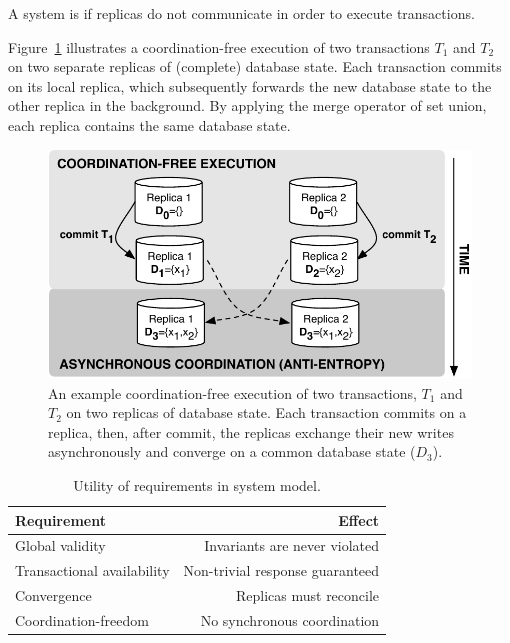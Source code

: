 \begin{definition}
A system is \textit{\cfree} if replicas do not communicate in order to
execute transactions.
\end{definition}

Figure~\ref{fig:replicas} illustrates a coordination-free execution of
two transactions $T_1$ and $T_2$ on two separate replicas of
(complete) database state. Each transaction commits on its local
replica, which subsequently forwards the new database state to the
other replica in the background. By applying the merge operator of set
union, each replica contains the same database state.

\begin{figure}
\begin{center}
\includegraphics[width=.85\columnwidth]{figs/replicas.pdf}
\end{center}\vspace{-1em}
\caption{An example coordination-free execution of two transactions,
  $T_1$ and $T_2$ on two replicas of database state. Each transaction
  commits on a replica, then, after commit, the replicas exchange
  their new writes asynchronously and converge on a common database
  state ($D_3$).}
\label{fig:replicas}
\end{figure}


\begin{table}
\begin{center}
\small
\begin{tabular}{|l|r|}
\hline\textbf{Requirement} & \textbf{Effect}  \\\hline
Global validity & Invariants are never violated \\
Transactional availability & Non-trivial response guaranteed \\
Convergence & Replicas must reconcile \\
Coordination-freedom & No synchronous coordination\\\hline
\end{tabular}
\end{center}\vspace{-1em}
\caption{Utility of requirements in system model.}
\label{table:requirements}
\end{table}


